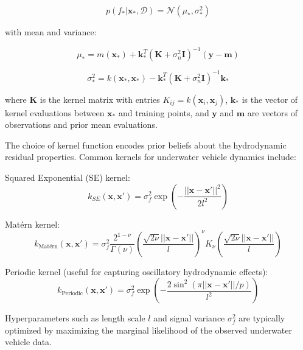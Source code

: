 \begin{equation}
p(f_* | \mathbf{x}_*, \mathcal{D}) = \mathcal{N}(\mu_*, \sigma_*^2)
\end{equation}

with mean and variance:

\begin{equation}
\mu_* = m(\mathbf{x}_*) + \mathbf{k}_*^T(\mathbf{K} + \sigma_n^2\mathbf{I})^{-1}(\mathbf{y} - \mathbf{m})
\end{equation}

\begin{equation}
\sigma_*^2 = k(\mathbf{x}_*, \mathbf{x}_*) - \mathbf{k}_*^T(\mathbf{K} + \sigma_n^2\mathbf{I})^{-1}\mathbf{k}_*
\end{equation}

where $\mathbf{K}$ is the kernel matrix with entries $K_{ij} = k(\mathbf{x}_i, \mathbf{x}_j)$, $\mathbf{k}_*$ is the vector of kernel evaluations between $\mathbf{x}_*$ and training points, and $\mathbf{y}$ and $\mathbf{m}$ are vectors of observations and prior mean evaluations.

The choice of kernel function encodes prior beliefs about the hydrodynamic residual properties. Common kernels for underwater vehicle dynamics include:

Squared Exponential (SE) kernel:
\begin{equation}
k_{SE}(\mathbf{x}, \mathbf{x}') = \sigma_f^2 \exp\left(-\frac{||\mathbf{x} - \mathbf{x}'||^2}{2l^2}\right)
\end{equation}

Matérn kernel:
\begin{equation}
k_{\text{Matérn}}(\mathbf{x}, \mathbf{x}') = \sigma_f^2 \frac{2^{1-\nu}}{\Gamma(\nu)}\left(\frac{\sqrt{2\nu}||\mathbf{x} - \mathbf{x}'||}{l}\right)^\nu K_\nu\left(\frac{\sqrt{2\nu}||\mathbf{x} - \mathbf{x}'||}{l}\right)
\end{equation}

Periodic kernel (useful for capturing oscillatory hydrodynamic effects):
\begin{equation}
k_{\text{Periodic}}(\mathbf{x}, \mathbf{x}') = \sigma_f^2 \exp\left(-\frac{2\sin^2(\pi||\mathbf{x} - \mathbf{x}'||/p)}{l^2}\right)
\end{equation}

Hyperparameters such as length scale $l$ and signal variance $\sigma_f^2$ are typically optimized by maximizing the marginal likelihood of the observed underwater vehicle data.

